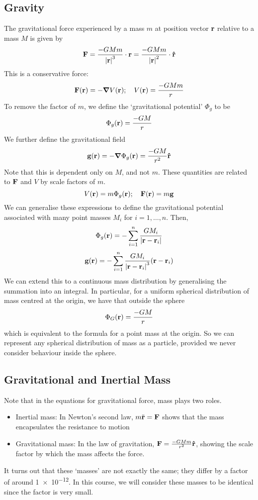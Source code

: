 \subsection{Gravity}
The gravitational force experienced by a mass \(m\) at position vector \(\vb r\) relative to a mass \(M\) is given by
\[
	\vb F = \frac{- G M m}{\abs{\vb r}^3} \cdot \vb r = \frac{- G M m}{\abs{\vb r}^2} \cdot \vu{r}
\]
This is a conservative force:
\[
	\vb F(\vb r) = -\grad V(\vb r);\quad V(\vb r) = \frac{-GMm}{r}
\]
To remove the factor of \(m\), we define the `gravitational potential' \(\Phi_g\) to be
\[
	\Phi_g(\vb r) = \frac{-GM}{r}
\]
We further define the gravitational field
\[
	\vb g(\vb r) = -\grad \Phi_g(\vb r) = \frac{-GM}{r^2}\vu{r}
\]
Note that this is dependent only on \(M\), and not \(m\).
These quantities are related to \(\vb F\) and \(V\) by scale factors of \(m\).
\[
	V(\vb r) = m \Phi_g(\vb r);\quad \vb F(\vb r) = m\vb g
\]
We can generalise these expressions to define the gravitational potential associated with many point masses \(M_i\) for \(i = 1, \dots, n\).
Then,
\[
	\Phi_g(\vb r) = -\sum_{i=1}^n \frac{GM_i}{\abs{\vb r - \vb r_i}}
\]
\[
	\vb g(\vb r) = -\sum_{i=1}^n \frac{GM_i}{\abs{\vb r - \vb r_i}^3}(\vb r - \vb r_i)
\]
We can extend this to a continuous mass distribution by generalising the summation into an integral.
In particular, for a uniform spherical distribution of mass centred at the origin, we have that outside the sphere
\[
	\Phi_G(\vb r) = \frac{-GM}{r}
\]
which is equivalent to the formula for a point mass at the origin.
So we can represent any spherical distribution of mass as a particle, provided we never consider behaviour inside the sphere.

\subsection{Gravitational and Inertial Mass}
Note that in the equations for gravitational force, mass plays two roles.
\begin{itemize}
	\item Inertial mass: In Newton's second law, \(m \ddot{\vb r} = \vb F\) shows that the mass encapsulates the resistance to motion
	\item Gravitational mass: In the law of gravitation, \(\vb F = \frac{-GMm}{r^2}\vu{r}\), showing the scale factor by which the mass affects the force.
\end{itemize}
It turns out that these `masses' are not exactly the same; they differ by a factor of around \num{1e-12}.
In this course, we will consider these masses to be identical since the factor is very small.

